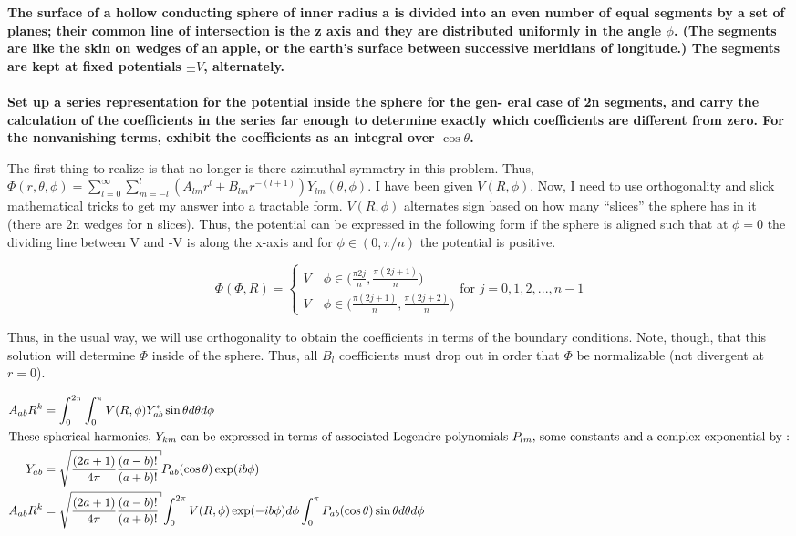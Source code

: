 \begin{homeworkProblem}[Jackson 3rd ed. : 3.4a]
\textbf{The surface of a hollow conducting sphere of inner radius a is divided into an even 
number of equal segments by a set of planes; their common line of intersection is 
the z axis and they are distributed uniformly in the angle $\phi$. (The segments are like 
the skin on wedges of an apple, or the earth's surface between successive meridians 
of longitude.) The segments are kept at fixed potentials $\pm V$, alternately. 
\\ \\ Set up a series representation for the potential inside the sphere for the gen- 
eral case of 2n segments, and carry the calculation of the coefficients in the 
series far enough to determine exactly which coefficients are different from 
zero. For the nonvanishing terms, exhibit the coefficients as an integral over $\cos\theta$.}
\\ \par
The first thing to realize is that no longer is there azimuthal symmetry in this problem. Thus, $\Phi(r,\theta,\phi) = \sum\limits_{l=0}^\infty \sum\limits_{m=-l}^l (A_{lm} r^l + B_{lm} r^{-(l+1)})Y_{lm}(\theta,\phi)$. I have been given $V(R,\phi)$. Now, I need to use orthogonality and slick mathematical tricks to get my answer into a tractable form. $V(R,\phi)$ alternates sign based on how many ``slices'' the sphere has in it (there are 2n wedges for n slices). Thus, the potential can be expressed in the following form if the sphere is aligned such that at $\phi = 0$ the dividing line between V and -V is along the x-axis and for $\phi \in (0,\pi/n)$ the potential is positive.

\[
\Phi(\Phi,R) =
\begin{cases}
V \quad \phi \in \big(\frac{\pi 2j}{n},\frac{\pi (2j+1)}{n}\big) \\
V \quad \phi \in \big(\frac{\pi (2j+1)}{n},\frac{\pi (2j+2)}{n}\big)
\end{cases}
\text{for $j = 0,1,2,...,n-1$}
\]

Thus, in the usual way, we will use orthogonality to obtain the coefficients in terms of the boundary conditions. Note, though, that this solution will determine $\Phi$ inside of the sphere. Thus, all $B_l$ coefficients must drop out in order that $\Phi$ be normalizable (not divergent at $r=0$).

\begin{align}
	A_{ab} R^k &= \int_0^{2\pi}\int_0^\pi V(R,\phi) Y_{ab}^* \sin\theta d\theta d\phi \nonumber \\
	\intertext{These spherical harmonics, $Y_{km}$ can be expressed in terms of associated Legendre polynomials $P_{lm}$, some constants and a complex exponential by :} \nonumber
	Y_{ab} &= \sqrt{\frac{(2a+1)}{4\pi}\frac{(a-b)!}{(a+b)!}} P_{ab}(\cos\theta) \exp(i b\phi) \nonumber \\
	A_{ab} R^k &= \sqrt{\frac{(2a+1)}{4\pi}\frac{(a-b)!}{(a+b)!}} \int_0^{2\pi} V(R,\phi) \exp(-i b\phi) d\phi \int_0^\pi  P_{ab}(\cos\theta)\sin\theta d\theta d\phi
\end{align}


\end{homeworkProblem}
